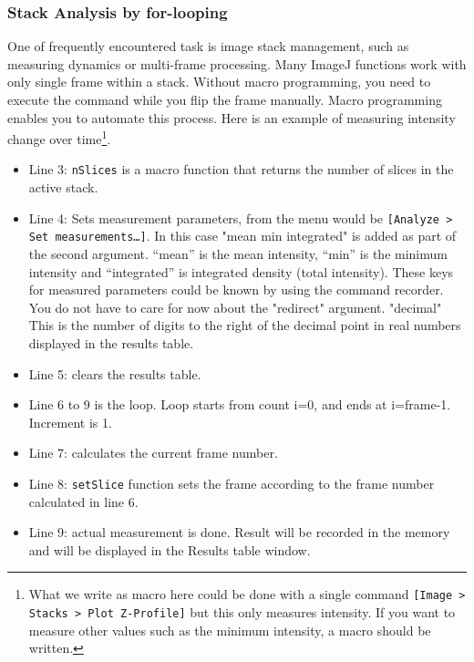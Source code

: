 \documentclass[11pt,a4paper,oneside]{report}
\newcommand{\ilcom}[1]{\texttt{\small#1}}
\begin{document}
\subsubsection{Stack Analysis by for-looping}
\label{sec:forloopStack}
One of frequently encountered task is image stack management, 
such as measuring dynamics or multi-frame processing. 
Many ImageJ functions work with only single frame within a stack. 
Without macro programming, you need to execute the command while you flip the frame manually. 
Macro programming enables you to automate this process. 
Here is an example of measuring intensity change over time\footnote{What we write as macro here could be done with a single command \ilcom{[Image > Stacks > Plot Z-Profile]} but this only measures intensity. If you want to measure other values such as the minimum intensity, a macro should be written. }. 

\begin{itemize}
\item Line 3: \ilcom{nSlices} is a macro function that returns the number of slices in the active stack. 
\item Line 4: Sets measurement parameters, from the menu would be \ilcom{[Analyze > Set measurements\ldots]}. In this case "mean min integrated" is added as part of the second argument. ``mean'' is the mean intensity, ``min'' is the minimum intensity and ``integrated'' is integrated density (total intensity). These keys for measured parameters could be known by using the command recorder. 
You do not have to care for now about the "redirect" argument. "decimal" This is the number of digits to 
the right of the decimal point in real numbers displayed in the results table. 

\item Line 5: clears the results table. 

\item Line 6 to 9 is the loop. Loop starts from count i=0, and ends at i=frame-1. Increment is 1.  

\item Line 7: calculates the current frame number. 

\item Line 8: \ilcom{setSlice} function sets the frame according to the frame number calculated in line 6. 

\item Line 9:  actual measurement is done. 
Result will be recorded in the memory and will be displayed in the Results table window. 
\end{itemize}
\end{document}
